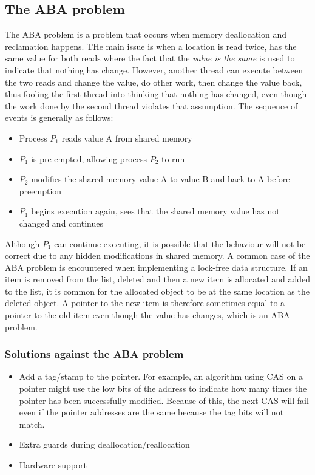 \documentclass[CS4204-Notes.tex]{subfiles}
\begin{document}
\subsection{The ABA problem}
The ABA problem is a problem that occurs when memory deallocation and reclamation happens. THe main issue is when a location is read twice, has the same value for both reads where the fact that the \textit{value is the same} is used to indicate that nothing has change. However, another thread can execute between the two reads and change the value, do other work, then change the value back, thus fooling the first thread into thinking that nothing has changed, even though the work done by the second thread violates that assumption. The sequence of events is generally as follows:
\begin{itemize}
\item Process $P_{1}$ reads value A from shared memory
\item $P_{1}$ is pre-empted, allowing process $P_{2}$ to run
\item $P_{2}$ modifies the shared memory value A to value B and back to A before preemption
\item $P_{1}$ begins execution again, sees that the shared memory value has not changed and continues
\end{itemize}
Although $P_{1}$ can continue executing, it is possible that the behaviour will not be correct due to any hidden modifications in shared memory.
\n
A common case of the ABA problem is encountered when implementing a lock-free data structure. If an item is removed from the list, deleted and then a new item is allocated and added to the list, it is common for the allocated object to be at the same location as the deleted object. A pointer to the new item is therefore sometimes equal to a pointer to the old item even though the value has changes, which is an ABA problem.

\subsubsection{Solutions against the ABA problem}
\begin{itemize}
\item Add a tag/stamp to the pointer. For example, an algorithm using CAS on a pointer might use the low bits of the address to indicate how many times the pointer has been successfully modified. Because of this, the next CAS will fail even if the pointer addresses are the same because the tag bits will not match.
\item Extra guards during deallocation/reallocation
\item Hardware support
\end{itemize}
\end{document}
